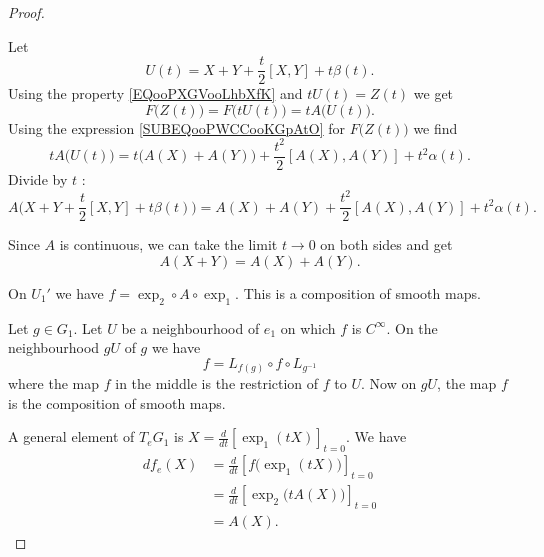 \begin{proof}
\begin{subproof}
		Let
		\begin{equation}
			U(t)=X+Y+\frac{ t }{2}[X,Y]+t\beta(t).
		\end{equation}
		Using the property \eqref{EQooPXGVooLhbXfK} and \( tU(t)=Z(t)\) we get
		\begin{equation}
			F\big( Z(t) \big)=F\big( tU(t) \big)=tA\big( U(t) \big).
		\end{equation}
		Using the expression \eqref{SUBEQooPWCCooKGpAtO} for	\( F\big( Z(t) \big)\) we find
		\begin{equation}
			tA\big( U(t) \big)=t\big( A(X)+A(Y) \big)+\frac{ t^2 }{2}[A(X),A(Y)]+t^2\alpha(t).
		\end{equation}
		Divide by \( t\) :
		\begin{equation}
			A\Big( X+Y+\frac{ t }{2}[X,Y]+t\beta(t) \Big)=A(X)+A(Y)+\frac{ t^2 }{2}[A(X),A(Y)]+t^2\alpha(t).
		\end{equation}

		Since \( A\) is continuous, we can take the limit \( t\to 0\) on both sides and get
		\begin{equation}
			A(X+Y)=A(X)+A(Y).
		\end{equation}
	\end{subproof}

	On \( U_1'\) we have \( f=\exp_2\circ A\circ \exp_1\). This is a composition of smooth maps.

	Let \( g\in G_1\). Let \( U\) be a neighbourhood of \( e_1\) on which \( f\) is \( C^{\infty}\). On the neighbourhood \( gU\) of \( g\) we have
	\begin{equation}
		f=L_{f(g)}\circ f\circ L_{g^{-1}}
	\end{equation}
	where the map \( f\) in the middle is the restriction of \( f\) to \( U\). Now on \( gU\), the map \( f\) is the composition of smooth maps.

	A general element of \( T_eG_1\) is \( X=\frac{d}{dt} \left[ \exp_1(tX)  \right]_{t=0}\). We have
	\begin{subequations}
		\begin{align}
			df_e(X) & =\frac{d}{dt} \left[ f\big( \exp_1(tX) \big)  \right]_{t=0} \\
			        & =\frac{d}{dt} \left[ \exp_2\big( tA(X) \big)  \right]_{t=0} \\
			        & =A(X).
		\end{align}
	\end{subequations}


\end{proof}
